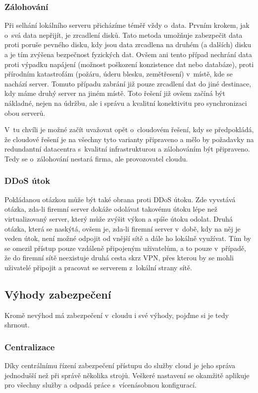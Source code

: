 \subsubsection{Zálohování}
Při selhání lokálního serveru přicházíme téměř vždy o~data. Prvním krokem, jak o~svá data nepřijít, je zrcadlení disků. Tato metoda umožňuje zabezpečit data proti poruše pevného disku, kdy jsou data zrcadlena na druhém (a dalších) disku a je tím zvýšena bezpečnost fyzických dat. Ovšem ani tento případ nechrání data proti výpadku napájení (možnost poškození konzistence dat nebo databáze), proti přírodním katastrofám (požáru, úderu blesku, zemětřesení) v~místě, kde se nachází server. Tomuto případu zabrání již pouze zrcadlení dat do jiné destinace, kdy máme druhý server na jiném místě. Toto řešení již ovšem začíná být nákladné, nejen na údržbu, ale i správu a kvalitní konektivitu pro synchronizaci obou serverů.

V~tu chvíli je možné začít uvažovat opět o~cloudovém řešení, kdy se předpokládá, že cloudové řešení je na všechny tyto varianty připraveno a mělo by požadavky na redundantní datacentra s~kvalitní infrastrukturou a zálohováním být připraveno. Tedy se o~zálohování nestará firma, ale provozovatel cloudu.\cite{podnikatel:zalohovani}

\subsubsection{DDoS útok}
Pokládanou otázkou může být také obrana proti DDoS útoku. Zde vyvstává otázka, zda-li firemní server dokáže odolávat takovému útoku lépe než virtualizovaný server, který může zvýšit výkon a spíše útoku odolat. Druhá otázka, která se naskýtá, ovšem je, zda-li firemní server v~době, kdy na něj je veden útok, není možné odpojit od vnější sítě a dále ho lokálně využívat. Tím by se omezil přístup pouze vzdáleně připojeným uživatelům, a to pouze v~případě, že do firemní sítě neexistuje druhá cesta skrz VPN, přes kterou by se mohli uživatelé připojit a pracovat se serverem z~lokální strany sítě.

\subsection{Výhody zabezpečení}
Kromě nevýhod má zabezpečení v~cloudu i své výhody, pojďme si je tedy shrnout.

\subsubsection{Centralizace}
Díky centrálnímu řízení zabezpečení přístupu do služby cloud je jeho správa jednodušší než při správě několika strojů. Veškeré nastavení se okamžitě aplikuje pro všechny služby a odpadá práce s~vícenásobnou konfigurací.

